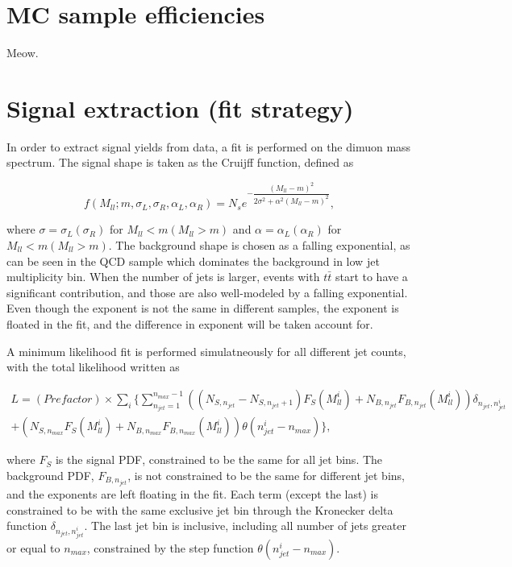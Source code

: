 \documentclass[10pt,a4paper,onecolumn]{article}
\begin{document}
\section{MC sample efficiencies}

Meow.

\section{Signal extraction (fit strategy)}

In order to extract signal yields from data, a fit is performed on the dimuon mass spectrum.
The signal shape is taken as the Cruijff function, defined as

\begin{equation}
f(M_{ll}; m, \sigma_L, \sigma_R, \alpha_L, \alpha_R) = N_s e^{-\dfrac{(M_{ll} - m)^2}{2 \sigma^2 + \alpha^2 (M_{ll} - m)^2}},\nonumber
\end{equation}

where $\sigma = \sigma_L (\sigma_R)$ for $M_{ll} < m (M_{ll} > m)$ and $\alpha = \alpha_L (\alpha_R)$ for $M_{ll} < m (M_{ll} > m)$.
The background shape is chosen as a falling exponential, as can be seen in the QCD sample which dominates the background in low
jet multiplicity bin.  When the number of jets is larger, events with $t\bar{t}$ start to have a significant contribution, and those are
also well-modeled by a falling exponential.
Even though the exponent is not the same in different samples, the exponent is floated in the fit, and the difference in exponent will be taken account for.

A minimum likelihood fit is performed simulatneously for all different jet counts, with the total likelihood written as

\begin{eqnarray}
L = (Prefactor) \times \displaystyle\sum_i \{ \displaystyle\sum_{n_{jet}=1}^{n_{max} - 1} \left( (N_{S, n_{jet}} - N_{S, n_{jet} + 1}) F_S(M_{ll}^i) + N_{B, n_{jet}} F_{B, n_{jet}}(M_{ll}^i) \right)
\delta_{n_{jet}, n_{jet}^i}\nonumber\\
+ \left( N_{S, n_{max}} F_S(M_{ll}^i) + N_{B, n_{max}} F_{B, n_{max}}(M_{ll}^i) \right) \theta(n_{jet}^i - n_{max}) \},
\nonumber
\end{eqnarray}

where $F_S$ is the signal PDF, constrained to be the same for all jet bins.  The background PDF, $F_{B, n_{jet}}$, is not constrained to
be the same for different jet bins, and the exponents are left floating in the fit.  Each term (except the last) is constrained to be with the same exclusive jet bin
through the Kronecker delta function $\delta_{n_{jet}, n_{jet}^i}$.
The last jet bin is inclusive, including all number of jets greater or equal to $n_{max}$, constrained by the step function $\theta(n_{jet}^i - n_{max})$.
\end{document}
